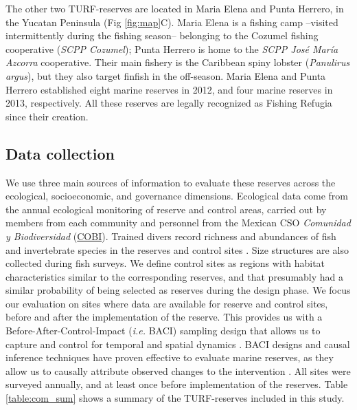 \documentclass{frontiersSCNS}
\begin{document}
The other two TURF-reserves are located in Maria Elena and Punta
Herrero, in the Yucatan Peninsula (Fig \ref{fig:map}C). Maria Elena is a
fishing camp --visited intermittently during the fishing season--
belonging to the Cozumel fishing cooperative (\emph{SCPP Cozumel});
Punta Herrero is home to the \emph{SCPP José María Azcorra} cooperative.
Their main fishery is the Caribbean spiny lobster (\emph{Panulirus
argus}), but they also target finfish in the off-season. Maria Elena and
Punta Herrero established eight marine reserves in 2012, and four marine
reserves in 2013, respectively. All these reserves are legally
recognized as Fishing Refugia since their creation.

\subsection{Data collection}\label{data-collection}

We use three main sources of information to evaluate these reserves
across the ecological, socioeconomic, and governance dimensions.
Ecological data come from the annual ecological monitoring of reserve
and control areas, carried out by members from each community and
personnel from the Mexican CSO \emph{Comunidad y Biodiversidad}
(\href{www.cobi.org.mx}{COBI}). Trained divers record richness and
abundances of fish and invertebrate species in the reserves and control
sites \citep{fulton_2018}. Size structures are also collected during
fish surveys. We define control sites as regions with habitat
characteristics similar to the corresponding reserves, and that
presumably had a similar probability of being selected as reserves
during the design phase. We focus our evaluation on sites where data are
available for reserve and control sites, before and after the
implementation of the reserve. This provides us with a
Before-After-Control-Impact (\emph{i.e.} BACI) sampling design that
allows us to capture and control for temporal and spatial dynamics
\citep{depalma_2018,ferraro_2006-oW}. BACI designs and causal inference
techniques have proven effective to evaluate marine reserves, as they
allow us to causally attribute observed changes to the intervention
\citep{moland_2013-VP,Villasenor-Derbez_2018}. All sites were surveyed
annually, and at least once before implementation of the reserves. Table
\ref{table:com_sum} shows a summary of the TURF-reserves included in
this study.

\clearpage
\end{document}
